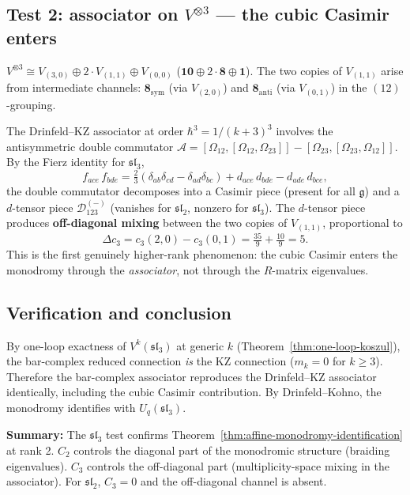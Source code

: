 \documentclass[11pt]{article}
\newcommand{\cD}{\mathcal{D}}
\newcommand{\fg}{\mathfrak{g}}
\newcommand{\fsl}{\mathfrak{sl}}
\providecommand{\mathscr}{\mathcal}
\begin{document}
\subsection*{Test 2: associator on $V^{\otimes 3}$ --- the cubic Casimir enters}
$V^{\otimes 3} \cong V_{(3,0)} \oplus 2 \cdot V_{(1,1)}
\oplus V_{(0,0)}$ ($\mathbf{10} \oplus 2\cdot\mathbf{8} \oplus \mathbf{1}$).
The two copies of $V_{(1,1)}$ arise from intermediate channels:
$\mathbf{8}_{\mathrm{sym}}$ (via $V_{(2,0)}$) and
$\mathbf{8}_{\mathrm{anti}}$ (via $V_{(0,1)}$) in the $(12)$-grouping.

The Drinfeld--KZ associator at order $\hbar^3 = 1/(k+3)^3$
involves the antisymmetric double commutator
$\mathscr{A} = [\Omega_{12}, [\Omega_{12}, \Omega_{23}]]
- [\Omega_{23}, [\Omega_{23}, \Omega_{12}]]$.
By the Fierz identity for $\fsl_3$,
\[
  f_{ace}\,f_{bde}
  = \tfrac{2}{3}(\delta_{ab}\delta_{cd} - \delta_{ad}\delta_{bc})
  + d_{ace}\,d_{bde} - d_{ade}\,d_{bce},
\]
the double commutator decomposes into a Casimir piece
(present for all $\fg$) and a $d$-tensor piece
$\cD_{123}^{(-)}$ (vanishes for $\fsl_2$, nonzero for $\fsl_3$).
The $d$-tensor piece produces \textbf{off-diagonal mixing}
between the two copies of $V_{(1,1)}$, proportional to
\[
  \Delta c_3 = c_3(2,0) - c_3(0,1)
  = \tfrac{35}{9} + \tfrac{10}{9} = 5.
\]
This is the first genuinely higher-rank phenomenon:
the cubic Casimir enters the monodromy through the
\emph{associator}, not through the $R$-matrix eigenvalues.

\subsection*{Verification and conclusion}
By one-loop exactness of $V^k(\fsl_3)$ at generic $k$
(Theorem~\ref{thm:one-loop-koszul}), the bar-complex reduced
connection \emph{is} the KZ connection ($m_k = 0$ for $k \geq 3$).
Therefore the bar-complex associator reproduces the Drinfeld--KZ
associator identically, including the cubic Casimir contribution.
By Drinfeld--Kohno, the monodromy identifies with $U_q(\fsl_3)$.

\textbf{Summary:}  The $\fsl_3$ test confirms
Theorem~\ref{thm:affine-monodromy-identification} at rank 2.
$C_2$ controls the diagonal part of the monodromic structure
(braiding eigenvalues).  $C_3$ controls the off-diagonal part
(multiplicity-space mixing in the associator).  For $\fsl_2$,
$C_3 = 0$ and the off-diagonal channel is absent.


\end{document}
